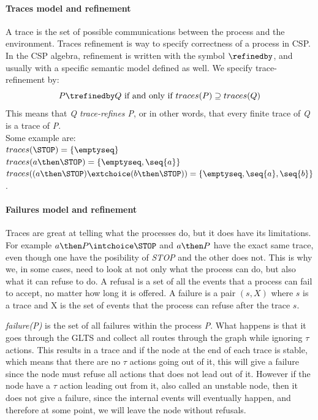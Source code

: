 \paragraph{Traces model and refinement}
A trace is the set of possible communications between the process and the environment. Traces refinement is way to specify correctness of a process in CSP. In the CSP algebra, refinement is written with the symbol $\refinedby$, and usually with a specific semantic model defined as well. We specify trace-refinement by: \\
$$P \trefinedby Q \text{ if and only if } traces(P) \supseteq traces(Q)$$
This means that \textit{Q trace-refines P}, or in other words, that every finite trace of \textit{Q} is a trace of \textit{P}. \\
Some example are:\\
$traces(\STOP) = \{\emptyseq\}$\\
$traces(a \then \STOP) = \{\emptyseq, \seq{a}\}$\\
$traces((a \then \STOP)\extchoice (b \then \STOP)) = \{\emptyseq, \seq{a}, \seq{b}\}$.
\paragraph{Failures model and refinement}
Traces are great at telling what the processes do, but it does have its limitations. For example $a \then P \intchoice \STOP$ and $a \then P$ have the exact same trace, even though one have the posibility of \textit{STOP} and the other does not. This is why we, in some cases, need to look at not only what the process can do, but also what it can refuse to do. A refusal is a set of all the events that a process can fail to accept, no matter how long it is offered. A failure is a pair $(s,X)$ where $s$ is a trace and X is the set of events that the process can refuse after the trace $s$.

\textit{failure(P)} is the set of all failures within the process \textit{P}. What happens is that it goes through the GLTS and collect all routes through the graph while ignoring $\tau$ actions. This results in a trace and if the node at the end of each trace is stable, which means that there are no $\tau$ actions going out of it, this will give a failure since the node must refuse all actions that does not lead out of it. However if the node have a $\tau$ action leading out from it, also called an unstable node, then it does not give a failure, since the internal events will eventually happen, and therefore at some point, we will leave the node without refusals.

